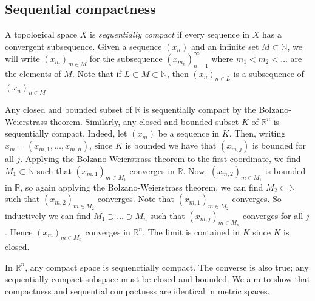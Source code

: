 \subsection{Sequential compactness}
\begin{definition}
	A topological space \( X \) is \textit{sequentially compact} if every sequence in \( X \) has a convergent subsequence.
	Given a sequence \( (x_n) \) and an infinite set \( M \subset \mathbb N \), we will write \( (x_m)_{m \in M} \) for the subsequence \( (x_{m_n})_{n=1}^\infty \) where \( m_1 < m_2 < \dots \) are the elements of \( M \).
	Note that if \( L \subset M \subset \mathbb N \), then \( (x_n)_{n \in L} \) is a subsequence of \( (x_n)_{n \in M} \).
\end{definition}
\begin{example}
	Any closed and bounded subset of \( \mathbb R \) is sequentially compact by the Bolzano-Weierstrass theorem.
	Similarly, any closed and bounded subset \( K \) of \( \mathbb R^n \) is sequentially compact.
	Indeed, let \( (x_m) \) be a sequence in \( K \).
	Then, writing \( x_m = (x_{m,1}, \dots, x_{m,n}) \), since \( K \) is bounded we have that \( (x_{m,j}) \) is bounded for all \( j \).
	Applying the Bolzano-Weierstrass theorem to the first coordinate, we find \( M_1 \subset \mathbb N \) such that \( (x_{m,1})_{m \in M_1} \) converges in \( \mathbb R \).
	Now, \( (x_{m,2})_{m \in M_1} \) is bounded in \( \mathbb R \), so again applying the Bolzano-Weierstrass theorem, we can find \( M_2 \subset \mathbb N \) such that \( (x_{m,2})_{m \in M_2} \) converges.
	Note that \( (x_{m,1})_{m \in M_2} \) converges.
	So inductively we can find \( M_1 \supset \dots \supset M_n \) such that \( (x_{m,j})_{m \in M_n} \) converges for all \( j \).
	Hence \( (x_m)_{m \in M_n} \) converges in \( \mathbb R^n \).
	The limit is contained in \( K \) since \( K \) is closed.
\end{example}
\begin{remark}
	In \( \mathbb R^n \), any compact space is sequenctially compact.
	The converse is also true; any sequentially compact subspace must be closed and bounded.
	We aim to show that compactness and sequential compactness are identical in metric spaces.
\end{remark}

